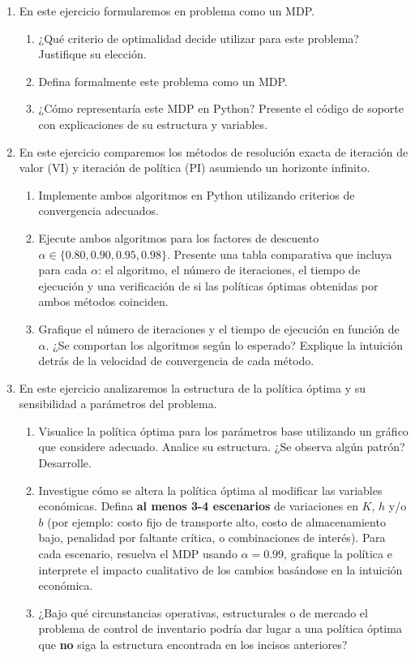 \documentclass[12pt]{article}
\begin{document}
\begin{enumerate} 
\item En este ejercicio formularemos en problema como un MDP.
\begin{enumerate}
    \item ¿Qué criterio de optimalidad decide utilizar para este problema? Justifique su elección.
    \item Defina formalmente este problema como un MDP. 
    \item ¿Cómo representaría este MDP en Python? Presente el código de soporte con explicaciones de su estructura y variables.
\end{enumerate}

\item En este ejercicio comparemos los métodos de resolución exacta de iteraci\'on de valor (VI) y  iteraci\'on de pol\'itica (PI) asumiendo un horizonte infinito.
\begin{enumerate}
    \item Implemente ambos algoritmos en Python utilizando criterios de convergencia adecuados.
    \item Ejecute ambos algoritmos para los factores de descuento $\alpha \in \{0.80, 0.90, 0.95, 0.98\}$. Presente una tabla comparativa que incluya para cada $\alpha$: el algoritmo, el número de iteraciones, el tiempo de ejecución y una verificación de si las políticas óptimas obtenidas por ambos métodos coinciden.
    \item Grafique el número de iteraciones y el tiempo de ejecución en función de $\alpha$. ¿Se comportan los algoritmos según lo esperado? Explique la intuición detrás de la velocidad de convergencia de cada método.
\end{enumerate}

\item En este ejercicio analizaremos la estructura de la política \'optima y su sensibilidad a par\'ametros del problema.
\begin{enumerate}
    \item Visualice la política óptima para los parámetros base utilizando un gr\'afico que considere adecuado. Analice su estructura. ¿Se observa algún patrón? Desarrolle.
    \item Investigue cómo se altera la política óptima al modificar las variables económicas. Defina \textbf{al menos 3-4 escenarios} de variaciones en $K$, $h$ y/o $b$ (por ejemplo: costo fijo de transporte alto, costo de almacenamiento bajo, penalidad por faltante crítica, o combinaciones de interés). Para cada escenario, resuelva el MDP usando $\alpha=0.99$, grafique la política e interprete el impacto cualitativo de los cambios basándose en la intuición económica.
    \item ¿Bajo qué circunstancias operativas, estructurales o de mercado el problema de control de inventario podría dar lugar a una política óptima que \textbf{no} siga la estructura encontrada en los incisos anteriores?
\end{enumerate}


\end{enumerate}
\end{document}
